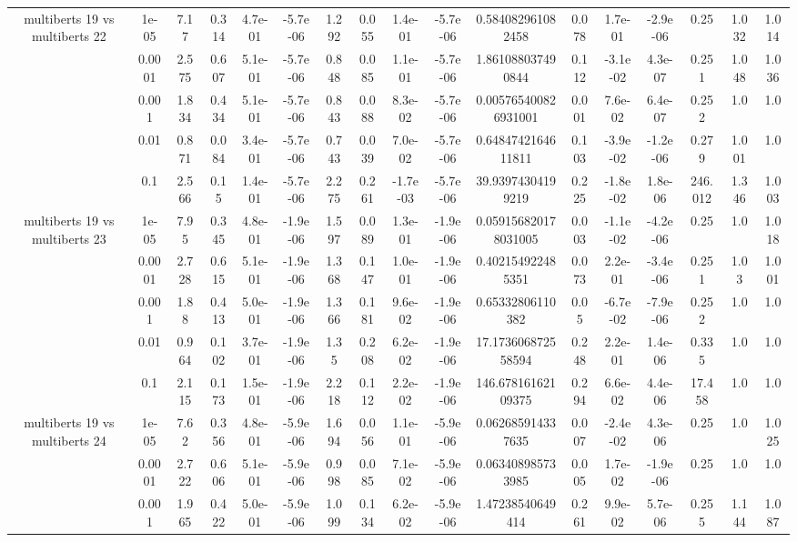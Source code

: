 \begin{tabular}{|c|c|c|c|c|c|c|c|c|c|c|c|c|c|c|c|c|}
\hline
\multirow{5}{*}{multiberts 19 vs multiberts 22} & 1e-05 & 7.17 & 0.314 & 4.7e-01 & -5.7e-06 & 1.292 & 0.055 & 1.4e-01 & -5.7e-06 & 0.584082961082458 & 0.078 & 1.7e-01 & -2.9e-06 & 0.25 & 1.032 & 1.014 \\
 & 0.0001 & 2.575 & 0.607 & 5.1e-01 & -5.7e-06 & 0.848 & 0.085 & 1.1e-01 & -5.7e-06 & 1.861088037490844 & 0.112 & -3.1e-02 & 4.3e-07 & 0.251 & 1.048 & 1.036 \\
 & 0.001 & 1.834 & 0.434 & 5.1e-01 & -5.7e-06 & 0.843 & 0.088 & 8.3e-02 & -5.7e-06 & 0.005765400826931001 & 0.001 & 7.6e-02 & 6.4e-07 & 0.252 & 1.0 & 1.0 \\
 & 0.01 & 0.871 & 0.084 & 3.4e-01 & -5.7e-06 & 0.743 & 0.039 & 7.0e-02 & -5.7e-06 & 0.6484742164611811 & 0.103 & -3.9e-02 & -1.2e-06 & 0.279 & 1.001 & 1.0 \\
 & 0.1 & 2.566 & 0.15 & 1.4e-01 & -5.7e-06 & 2.275 & 0.261 & -1.7e-03 & -5.7e-06 & 39.93974304199219 & 0.225 & -1.8e-02 & 1.8e-06 & 246.012 & 1.346 & 1.003 \\
\hline
\multirow{5}{*}{multiberts 19 vs multiberts 23} & 1e-05 & 7.95 & 0.345 & 4.8e-01 & -1.9e-06 & 1.597 & 0.089 & 1.3e-01 & -1.9e-06 & 0.059156820178031005 & 0.003 & -1.1e-02 & -4.2e-06 & 0.25 & 1.0 & 1.018 \\
 & 0.0001 & 2.728 & 0.615 & 5.1e-01 & -1.9e-06 & 1.368 & 0.147 & 1.0e-01 & -1.9e-06 & 0.402154922485351 & 0.073 & 2.2e-01 & -3.4e-06 & 0.251 & 1.03 & 1.001 \\
 & 0.001 & 1.88 & 0.413 & 5.0e-01 & -1.9e-06 & 1.366 & 0.181 & 9.6e-02 & -1.9e-06 & 0.65332806110382 & 0.05 & -6.7e-02 & -7.9e-06 & 0.252 & 1.0 & 1.0 \\
 & 0.01 & 0.964 & 0.102 & 3.7e-01 & -1.9e-06 & 1.35 & 0.208 & 6.2e-02 & -1.9e-06 & 17.173606872558594 & 0.248 & 2.2e-01 & 1.4e-06 & 0.335 & 1.0 & 1.0 \\
 & 0.1 & 2.115 & 0.173 & 1.5e-01 & -1.9e-06 & 2.218 & 0.112 & 2.2e-02 & -1.9e-06 & 146.67816162109375 & 0.294 & 6.6e-02 & 4.4e-06 & 17.458 & 1.0 & 1.0 \\
\hline
\multirow{5}{*}{multiberts 19 vs multiberts 24} & 1e-05 & 7.62 & 0.356 & 4.8e-01 & -5.9e-06 & 1.694 & 0.056 & 1.1e-01 & -5.9e-06 & 0.062685914337635 & 0.007 & -2.4e-02 & 4.3e-06 & 0.25 & 1.0 & 1.025 \\
 & 0.0001 & 2.722 & 0.606 & 5.1e-01 & -5.9e-06 & 0.998 & 0.085 & 7.1e-02 & -5.9e-06 & 0.063408985733985 & 0.005 & 1.7e-02 & -1.9e-06 & 0.25 & 1.0 & 1.0 \\
 & 0.001 & 1.965 & 0.422 & 5.0e-01 & -5.9e-06 & 1.099 & 0.134 & 6.2e-02 & -5.9e-06 & 1.47238540649414 & 0.261 & 9.9e-02 & 5.7e-06 & 0.255 & 1.144 & 1.087 \\

\end{tabular}

